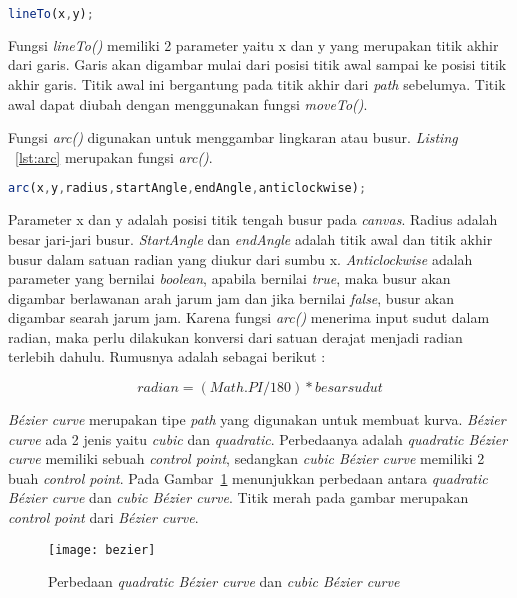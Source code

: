 \begin{lstlisting}[language=Javascript, caption=Fungsi \textit{lineTo()}, label={lst:line}]
	lineTo(x,y);
\end{lstlisting}

Fungsi \textit{lineTo()} memiliki 2 parameter yaitu x dan y yang merupakan titik akhir dari garis. Garis akan digambar mulai dari posisi titik awal sampai ke posisi titik akhir garis. Titik awal ini bergantung pada titik akhir dari \textit{path} sebelumya. Titik awal dapat diubah dengan menggunakan fungsi \textit{moveTo()}.

Fungsi \textit{arc()} digunakan untuk menggambar lingkaran atau busur. \textit{Listing} ~\ref{lst:arc} merupakan fungsi \textit{arc()}.

\begin{lstlisting}[language=Javascript, caption=Fungsi \textit{arc()}, label={lst:arc}]
	arc(x,y,radius,startAngle,endAngle,anticlockwise);
\end{lstlisting}

Parameter x dan y adalah posisi titik tengah busur pada \textit{canvas}. Radius adalah besar jari-jari busur. \textit{StartAngle} dan \textit{endAngle} adalah titik awal dan titik akhir busur dalam satuan radian yang diukur dari sumbu x. \textit{Anticlockwise} adalah parameter yang bernilai \textit{boolean}, apabila bernilai \textit{true}, maka busur akan digambar berlawanan arah jarum jam dan jika bernilai \textit{false}, busur akan digambar searah jarum jam. Karena fungsi \textit{arc()} menerima input sudut dalam radian, maka perlu dilakukan konversi dari satuan derajat menjadi radian terlebih dahulu. Rumusnya adalah sebagai berikut :

\begin{displaymath}
	radian = (Math.PI / 180) * besar sudut
\end{displaymath}	

\textit{B\'ezier curve} merupakan tipe \textit{path} yang digunakan untuk membuat kurva. \textit{B\'ezier curve} ada 2 jenis yaitu \textit{cubic} dan \textit{quadratic}. Perbedaanya adalah \textit{quadratic B\'ezier curve} memiliki sebuah \textit{control point}, sedangkan \textit{cubic B\'ezier curve} memiliki 2 buah \textit{control point}. Pada Gambar~\ref{fig:bezier} menunjukkan perbedaan antara \textit{quadratic B\'ezier curve} dan \textit{cubic B\'ezier curve}. Titik merah pada gambar merupakan \textit{control point} dari \textit{B\'ezier curve}.

\begin{figure}[H]
	\centering  
	\texttt{[image: bezier]}
	\caption[Perbedaan \textit{quadratic B\'ezier curve} dan \textit{cubic B\'ezier curve}]{Perbedaan \textit{quadratic B\'ezier curve} dan \textit{cubic B\'ezier curve}\cite{MDN:05:Web}}
	\label{fig:bezier} 
\end{figure} 

